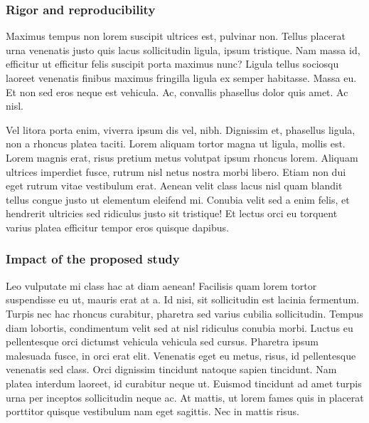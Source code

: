 \documentclass[11pt,]{article}
\begin{document}
\hypertarget{rigor-and-reproducibility}{%
\subsubsection{Rigor and
reproducibility}\label{rigor-and-reproducibility}}

Maximus tempus non lorem suscipit ultrices est, pulvinar non. Tellus
placerat urna venenatis justo quis lacus sollicitudin ligula, ipsum
tristique. Nam massa id, efficitur ut efficitur felis suscipit porta
maximus nunc? Ligula tellus sociosqu laoreet venenatis finibus maximus
fringilla ligula ex semper habitasse. Massa eu. Et non sed eros neque
est vehicula. Ac, convallis phasellus dolor quis amet. Ac nisl.

Vel litora porta enim, viverra ipsum dis vel, nibh. Dignissim et,
phasellus ligula, non a rhoncus platea taciti. Lorem aliquam tortor
magna ut ligula, mollis est. Lorem magnis erat, risus pretium metus
volutpat ipsum rhoncus lorem. Aliquam ultrices imperdiet fusce, rutrum
nisl netus nostra morbi libero. Etiam non dui eget rutrum vitae
vestibulum erat. Aenean velit class lacus nisl quam blandit tellus
congue justo ut elementum eleifend mi. Conubia velit sed a enim felis,
et hendrerit ultricies sed ridiculus justo sit tristique! Et lectus orci
eu torquent varius platea efficitur tempor eros quisque dapibus.

\hypertarget{impact-of-the-proposed-study}{%
\subsubsection{Impact of the proposed
study}\label{impact-of-the-proposed-study}}

Leo vulputate mi class hac at diam aenean! Facilisis quam lorem tortor
suspendisse eu ut, mauris erat at a. Id nisi, sit sollicitudin est
lacinia fermentum. Turpis nec hac rhoncus curabitur, pharetra sed varius
cubilia sollicitudin. Tempus diam lobortis, condimentum velit sed at
nisl ridiculus conubia morbi. Luctus eu pellentesque orci dictumst
vehicula vehicula sed cursus. Pharetra ipsum malesuada fusce, in orci
erat elit. Venenatis eget eu metus, risus, id pellentesque venenatis sed
class. Orci dignissim tincidunt natoque sapien tincidunt. Nam platea
interdum laoreet, id curabitur neque ut. Euismod tincidunt ad amet
turpis urna per inceptos sollicitudin neque ac. At mattis, ut lorem
fames quis in placerat porttitor quisque vestibulum nam eget sagittis.
Nec in mattis risus.


\end{document}
